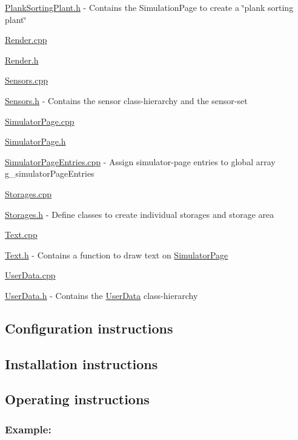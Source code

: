 \begin{DoxyItemize}
\item \hyperlink{PlankSortingPlant_8h}{Plank\-Sorting\-Plant.\-h} -\/ Contains the Simulation\-Page to create a \char`\"{}plank sorting plant\char`\"{}
\item \hyperlink{Render_8cpp}{Render.\-cpp}
\item \hyperlink{Render_8h}{Render.\-h}
\item \hyperlink{Sensors_8cpp}{Sensors.\-cpp}
\item \hyperlink{Sensors_8h}{Sensors.\-h} -\/ Contains the sensor class-\/hierarchy and the sensor-\/set
\item \hyperlink{SimulatorPage_8cpp}{Simulator\-Page.\-cpp}
\item \hyperlink{SimulatorPage_8h}{Simulator\-Page.\-h}
\item \hyperlink{SimulatorPageEntries_8cpp}{Simulator\-Page\-Entries.\-cpp} -\/ Assign simulator-\/page entries to global array g\-\_\-simulator\-Page\-Entries
\item \hyperlink{Storages_8cpp}{Storages.\-cpp}
\item \hyperlink{Storages_8h}{Storages.\-h} -\/ Define classes to create individual storages and storage area
\item \hyperlink{Text_8cpp}{Text.\-cpp}
\item \hyperlink{Text_8h}{Text.\-h} -\/ Contains a function to draw text on \hyperlink{classSimulatorPage}{Simulator\-Page}
\item \hyperlink{UserData_8cpp}{User\-Data.\-cpp}
\item \hyperlink{UserData_8h}{User\-Data.\-h} -\/ Contains the \hyperlink{classUserData}{User\-Data} class-\/hierarchy
\end{DoxyItemize}

\subsection*{Configuration instructions}

\subsection*{Installation instructions}

\subsection*{Operating instructions}

\subsubsection*{Example\-:}

